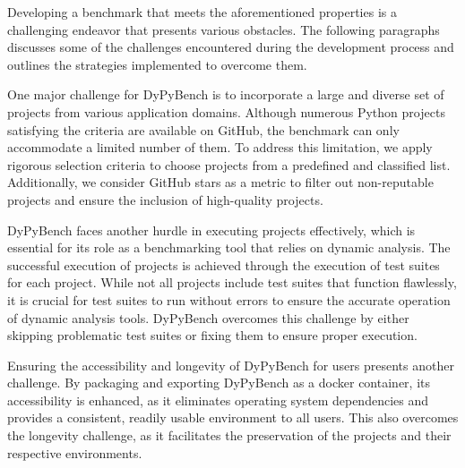 Developing a benchmark that meets the aforementioned properties is a challenging endeavor that presents various obstacles. The following paragraphs discusses some of the challenges encountered during the development process and outlines the strategies implemented to overcome them.

One major challenge for DyPyBench is to incorporate a large and diverse set of projects from various application domains.
Although numerous Python projects satisfying the criteria are available on GitHub, the benchmark can only accommodate a limited number of them.
To address this limitation, we apply rigorous selection criteria to choose projects from a predefined and classified list.
Additionally, we consider GitHub stars as a metric to filter out non-reputable projects and ensure the inclusion of high-quality projects.

DyPyBench faces another hurdle in executing projects effectively, which is essential for its role as a benchmarking tool that relies on dynamic analysis.
The successful execution of projects is achieved through the execution of test suites for each project.
While not all projects include test suites that function flawlessly, it is crucial for test suites to run without errors to ensure the accurate operation of dynamic analysis tools.
DyPyBench overcomes this challenge by either skipping problematic test suites or fixing them to ensure proper execution.


Ensuring the accessibility and longevity of DyPyBench for users presents another challenge.
By packaging and exporting DyPyBench as a docker container, its accessibility is enhanced, as it eliminates operating system dependencies and provides a consistent, readily usable environment to all users.
This also overcomes the longevity challenge, as it facilitates the preservation of the projects and their respective environments.

